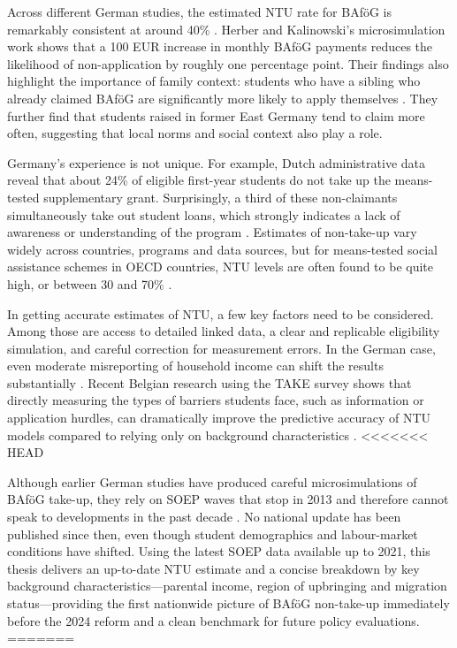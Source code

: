 Across different German studies, the estimated NTU rate for BAföG is remarkably consistent at around 40\% \citep{goedeme_concept_2020, mechelen_who_2017}. Herber and Kalinowski’s microsimulation work shows that a 100 EUR increase in monthly BAföG payments reduces the likelihood of non-application by roughly one percentage point. Their findings also highlight the importance of family context: students who have a sibling who already claimed BAföG are significantly more likely to apply themselves \citep{frick_claim_2007, bruckmeier_new_2012}. They further find that students raised in former East Germany tend to claim more often, suggesting that local norms and social context also play a role.

Germany’s experience is not unique. For example, Dutch administrative data reveal that about 24\% of eligible first-year students do not take up the means-tested supplementary grant. Surprisingly, a third of these non-claimants simultaneously take out student loans, which strongly indicates a lack of awareness or understanding of the program \citep{konijn_quantifying_2023}. Estimates of non-take-up vary widely across countries, programs and data sources, but for means-tested social assistance schemes in OECD countries, NTU levels are often found to be quite high, or between 30 and 70\% \citep{goedeme_concept_2020}.

In getting accurate estimates of NTU, a few key factors need to be considered. Among those are access to detailed linked data, a clear and replicable eligibility simulation, and careful correction for measurement errors. In the German case, even moderate misreporting of household income can shift the results substantially \citep{goedeme_concept_2020, frick_claim_2007}. Recent Belgian research using the TAKE survey shows that directly measuring the types of barriers students face, such as information or application hurdles, can dramatically improve the predictive accuracy of NTU models compared to relying only on background characteristics \citep{bolland_information_nodate}.
<<<<<<< HEAD

Although earlier German studies have produced careful microsimulations of BAföG take-up, they rely on SOEP waves that stop in 2013 and therefore cannot speak to developments in the past decade \citep{herber_non-take-up_2019, bruckmeier_new_2012}. No national update has been published since then, even though student demographics and labour-market conditions have shifted. Using the latest SOEP data available up to 2021, this thesis delivers an up-to-date NTU estimate and a concise breakdown by key background characteristics—parental income, region of upbringing and migration status—providing the first nationwide picture of BAföG non-take-up immediately before the 2024 reform and a clean benchmark for future policy evaluations.
=======

